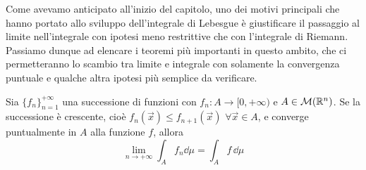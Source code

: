 Come avevamo anticipato all'inizio del capitolo, uno dei motivi principali che hanno portato allo sviluppo dell'integrale di Lebesgue è giustificare il passaggio al limite nell'integrale con ipotesi meno restrittive che con l'integrale di Riemann.
Passiamo dunque ad elencare i teoremi più importanti in questo ambito, che ci permetteranno lo scambio tra limite e integrale con solamente la convergenza puntuale e qualche altra ipotesi più semplice da verificare.
\begin{teorema} \label{t:convergenza-monotona}
	Sia $\{f_n\}_{n=1}^{+\infty}$ una successione di funzioni con $f_n\colon A\to[0,+\infty)$ e $A\in\mathcal M(\mathbb{R}^n)$.
	Se la successione è crescente, cioè $f_n(\vec x)\leq f_{n+1}(\vec x)$ $\forall\vec x\in A$, e converge puntualmente in $A$ alla funzione $f$, allora
	\begin{equation}
		\lim_{n\to+\infty}\int_Af_n\dd\mu=\int_Af\,\dd\mu
		\label{eq:convergenza-monotona}
	\end{equation}
\end{teorema}
